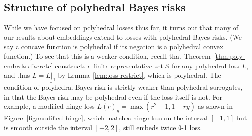 \documentclass[11pt]{article}
\newcommand{\Sc}{\mathcal{S}}
\newcommand{\risk}[1]{\underline{#1}}
\begin{document}
\subsection{Structure of polyhedral Bayes risks}

While we have focused on polyhedral losses thus far, it turns out that many of our results about embeddings extend to losses with polyhedral Bayes risks.
(We say a concave function is polyhedral if its negation is a polyhedral convex function.)
To see that this is a weaker condition, recall that Theorem~\ref{thm:poly-embeds-discrete} constructs a finite representative set $\Sc$ for any polyhedral loss $L$, and thus $\risk{L} = \risk{L|_\Sc}$ by Lemma~\ref{lem:loss-restrict}, which is polyhedral.
The condition of polyhedral Bayes risk is strictly weaker than polyhedral surrogates, in that the Bayes risk may be polyhedral even if the loss itself is not.
For example, a modified hinge loss $L(r)_y = \max(r^2-1,1-ry)$ as shown in Figure~\ref{fig:modified-hinge}, which matches hinge loss on the interval $[-1,1]$ but is smooth outside the interval $[-2,2]$, still embeds twice 0-1 loss.
\end{document}
